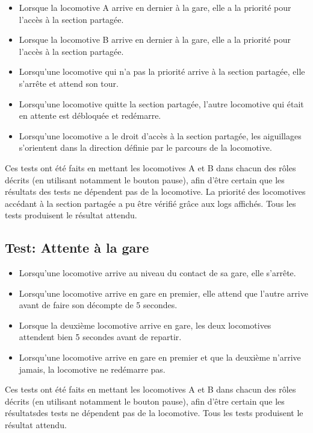 \documentclass{article}
\begin{document}
\begin{itemize}
    
\item Lorsque la locomotive A arrive en dernier à la gare, elle a la priorité pour l'accès à la section partagée.
\item Lorsque la locomotive B arrive en dernier à la gare, elle a la priorité pour l'accès à la section partagée.
\item Lorsqu'une locomotive qui n'a pas la priorité arrive à la section partagée, elle s'arrête et attend son tour.
\item Lorsqu'une locomotive quitte la section partagée, l'autre locomotive qui était en attente est débloquée et redémarre.
\item Lorsqu'une locomotive a le droit d'accès à la section partagée, les aiguillages s'orientent dans la direction définie
par le parcours de la locomotive.

\end{itemize}

Ces tests ont été faits en mettant les locomotives A et B dans chacun des rôles décrits  (en utilisant notamment le bouton pause), 
afin d'être certain que les résultats des tests ne dépendent pas de la locomotive. La priorité des locomotives accédant à la section 
partagée a pu être vérifié grâce aux logs affichés. Tous les tests produisent le résultat attendu.

\subsection*{Test: Attente à la gare}

\begin{itemize}
    
\item Lorsqu'une locomotive arrive au niveau du contact de sa gare, elle s'arrête.
\item Lorsqu'une locomotive arrive en gare en premier, elle attend que l'autre arrive avant de faire son décompte de 5 secondes.
\item Lorsque la deuxième locomotive arrive en gare, les deux locomotives attendent bien 5 secondes avant de repartir.
\item Lorsqu'une locomotive arrive en gare en premier et que la deuxième n'arrive jamais, la locomotive ne redémarre pas. 
    
\end{itemize}

Ces tests ont été faits en mettant les locomotives A et B dans chacun des rôles décrits (en utilisant notamment le bouton pause), 
afin d'être certain que les résultatsdes tests ne dépendent pas de la locomotive. Tous les tests produisent le résultat attendu.
\end{document}
